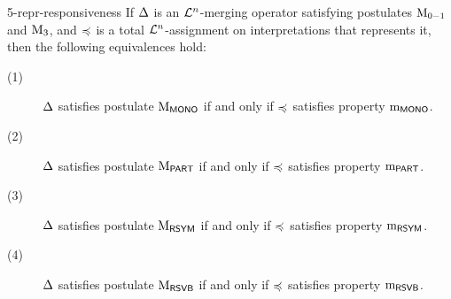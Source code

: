 \begin{thm}{}{5-repr-responsiveness}
	If $\Delta$ is an $\mathcal{L}^{n}$-merging operator satisfying postulates $\mathrm{M}_{0-1}$ and $\mathrm{M}_{3}$,
	and $\preccurlyeq$ is a total $\mathcal{L}^n$-assignment on interpretations that represents it,
	then the following equivalences hold:
	\begin{description}
		\item[(1)] $\Delta$ satisfies postulate $\mathrm{M}_{\mathsf{MONO}}$ if and only if $\preccurlyeq$ satisfies property $\mathrm{m}_{\mathsf{MONO}}$.
		\item[(2)] $\Delta$ satisfies postulate $\mathrm{M}_{\mathsf{PART}}$ if and only if $\preccurlyeq$ satisfies property $\mathrm{m}_{\mathsf{PART}}$.
		\item[(3)] $\Delta$ satisfies postulate $\mathrm{M}_{\mathsf{RSYM}}$ if and only if $\preccurlyeq$ satisfies property $\mathrm{m}_{\mathsf{RSYM}}$.
		\item[(4)] $\Delta$ satisfies postulate $\mathrm{M}_{\mathsf{RSVB}}$ if and only if $\preccurlyeq$ satisfies property $\mathrm{m}_{\mathsf{RSVB}}$.
	\end{description}
\end{thm}
